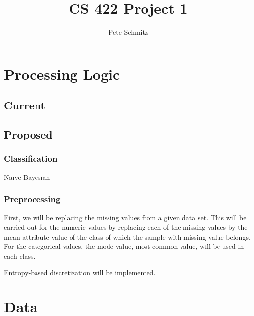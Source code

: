 \documentclass{article}
\title{CS 422 Project 1}
\author{Pete Schmitz}
\begin{document}
\maketitle

\newpage

\tableofcontents
\newpage


\section{Processing Logic}
    \subsection{Current}

    \subsection{Proposed}

        \subsubsection{Classification}
        Naive Bayesian


        \subsubsection{Preprocessing}
        First, we will be replacing the missing values from a given data set.
        This will be carried out for the numeric values by replacing each of
        the missing values by the mean attribute value of the class of which
        the sample with missing value belongs.  For the categorical values,
        the mode value, most common value, will be used in each class.

        Entropy-based discretization will be implemented.  %

\section{Data}
\end{document}
